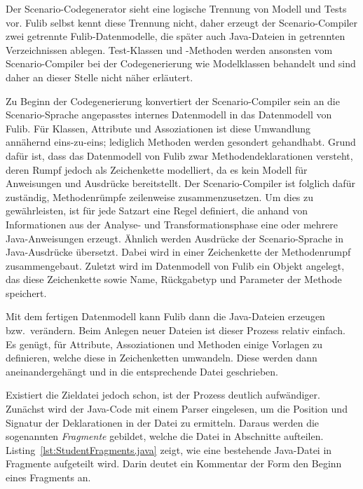 Der Scenario-Codegenerator sieht eine logische Trennung von Modell und Tests vor.
Fulib selbst kennt diese Trennung nicht, daher erzeugt der Scenario-Compiler zwei getrennte Fulib-Datenmodelle, die später auch Java-Dateien in getrennten Verzeichnissen ablegen.
Test-Klassen und -Methoden werden ansonsten vom Scenario-Compiler bei der Codegenerierung wie Modelklassen behandelt und sind daher an dieser Stelle nicht näher erläutert.

Zu Beginn der Codegenerierung konvertiert der Scenario-Compiler sein an die Scenario-Sprache angepasstes internes Datenmodell in das Datenmodell von Fulib.
Für Klassen, Attribute und Assoziationen ist diese Umwandlung annähernd eins-zu-eins;
lediglich Methoden werden gesondert gehandhabt.
Grund dafür ist, dass das Datenmodell von Fulib zwar Methodendeklarationen versteht, deren Rumpf jedoch als Zeichenkette modelliert, da es kein Modell für Anweisungen und Ausdrücke bereitstellt.
Der Scenario-Compiler ist folglich dafür zuständig, Methodenrümpfe zeilenweise zusammenzusetzen.
Um dies zu gewährleisten, ist für jede Satzart eine Regel definiert, die anhand von Informationen aus der Analyse- und Transformationsphase eine oder mehrere Java-Anweisungen erzeugt.
Ähnlich werden Ausdrücke der Scenario-Sprache in Java-Ausdrücke übersetzt.
Dabei wird in einer Zeichenkette der Methodenrumpf zusammengebaut.
Zuletzt wird im Datenmodell von Fulib ein Objekt angelegt, das diese Zeichenkette sowie Name, Rückgabetyp und Parameter der Methode speichert.

Mit dem fertigen Datenmodell kann Fulib dann die Java-Dateien erzeugen bzw.\ verändern.
Beim Anlegen neuer Dateien ist dieser Prozess relativ einfach.
Es genügt, für Attribute, Assoziationen und Methoden einige Vorlagen zu definieren, welche diese in Zeichenketten umwandeln.
Diese werden dann aneinandergehängt und in die entsprechende Datei geschrieben.

Existiert die Zieldatei jedoch schon, ist der Prozess deutlich aufwändiger.
Zunächst wird der Java-Code mit einem Parser eingelesen, um die Position und Signatur der Deklarationen in der Datei zu ermitteln.
Daraus werden die sogenannten \emph{Fragmente} gebildet, welche die Datei in Abschnitte aufteilen.
Listing~\ref{lst:StudentFragments.java} zeigt, wie eine bestehende Java-Datei in Fragmente aufgeteilt wird.
Darin deutet ein Kommentar der Form  den Beginn eines Fragments an.

